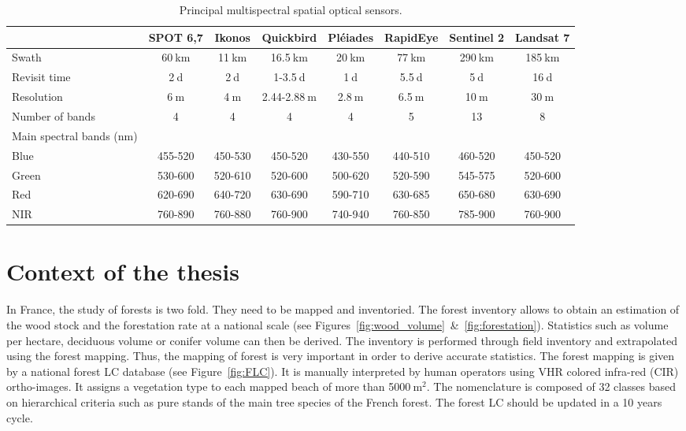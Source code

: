 \begin{table}
\begin{center}
\begin{tabular}{l|c|c|c|c|c|c|c}
& \textbf{SPOT 6,7} & \textbf{Ikonos} & \textbf{Quickbird} & \textbf{Pléiades} & \textbf{RapidEye} & \textbf{Sentinel 2} & \textbf{Landsat 7}\\
\hline
Swath & 60$\:$km & 11$\:$km & 16.5$\:$km & 20$\:$km & 77$\:$km & 290$\:$km & 185$\:$km\\
Revisit time & 2$\:$d & 2$\:$d & 1-3.5$\:$d & 1$\:$d & 5.5$\:$d & 5$\:$d & 16$\:$d\\
Resolution & 6$\:$m & 4$\:$m & 2.44-2.88$\:$m & 2.8$\:$m & 6.5$\:$m & 10$\:$m & 30$\:$m\\
Number of bands & 4 & 4 & 4 & 4 & 5 & 13 & 8\\
Main spectral bands (nm) & & & & & & &\\
Blue & 455-520 & 450-530 & 450-520 & 430-550 & 440-510 & 460-520 & 450-520\\ 
Green & 530-600 & 520-610 & 520-600 & 500-620 & 520-590 & 545-575 & 520-600\\
Red & 620-690 & 640-720 & 630-690 & 590-710 & 630-685 & 650-680 & 630-690\\
NIR & 760-890 & 760-880 & 760-900 & 740-940 & 760-850 & 785-900 & 760-900\\
\end{tabular}
\end{center}
\caption{Principal multispectral spatial optical sensors.}
\label{table:spatial_satellites}
\end{table}

\section{Context of the thesis}
In France, the study of forests is two fold. They need to be mapped and inventoried. The forest inventory allows to obtain an estimation of the wood stock and the forestation rate at a national scale (see Figures~\ref{fig:wood_volume}~\&~\ref{fig:forestation}). Statistics such as volume per hectare, deciduous volume or conifer volume can then be derived. The inventory is performed through field inventory and extrapolated using the forest mapping. Thus, the mapping of forest is very important in order to derive accurate statistics.	
The forest mapping is given by a national forest LC database (see Figure~\ref{fig:FLC}). It is manually interpreted by human operators using VHR colored infra-red (CIR) ortho-images. It assigns a vegetation type to each mapped beach of more than 5000$\:$m$^{2}$. The nomenclature is composed of 32 classes based on hierarchical criteria such as pure stands of the main tree species of the French forest. The forest LC should be updated in a 10 years cycle.

